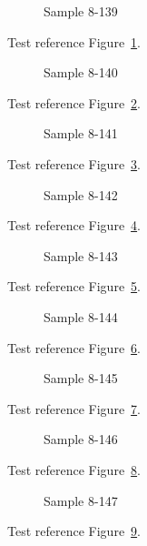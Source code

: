 \begin{figure}[tbhp]
\caption{Sample 8-139}
\label{fig:sample-8-139}
\end{figure}

Test reference Figure~\ref{fig:sample-8-139}.

\begin{figure}[tbhp]
\caption{Sample 8-140}
\label{fig:sample-8-140}
\end{figure}

Test reference Figure~\ref{fig:sample-8-140}.

\begin{figure}[tbhp]
\caption{Sample 8-141}
\label{fig:sample-8-141}
\end{figure}

Test reference Figure~\ref{fig:sample-8-141}.

\begin{figure}[tbhp]
\caption{Sample 8-142}
\label{fig:sample-8-142}
\end{figure}

Test reference Figure~\ref{fig:sample-8-142}.

\begin{figure}[tbhp]
\caption{Sample 8-143}
\label{fig:sample-8-143}
\end{figure}

Test reference Figure~\ref{fig:sample-8-143}.

\begin{figure}[tbhp]
\caption{Sample 8-144}
\label{fig:sample-8-144}
\end{figure}

Test reference Figure~\ref{fig:sample-8-144}.

\begin{figure}[tbhp]
\caption{Sample 8-145}
\label{fig:sample-8-145}
\end{figure}

Test reference Figure~\ref{fig:sample-8-145}.

\begin{figure}[tbhp]
\caption{Sample 8-146}
\label{fig:sample-8-146}
\end{figure}

Test reference Figure~\ref{fig:sample-8-146}.

\begin{figure}[tbhp]
\caption{Sample 8-147}
\label{fig:sample-8-147}
\end{figure}

Test reference Figure~\ref{fig:sample-8-147}.

